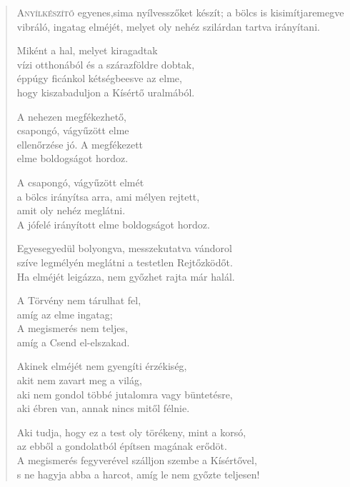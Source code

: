 
\vspace*{-\baselineskip}
\begin{verse}

{\par%
\lettrine[slope=0.5em]{A}{nyílkészítő} {\LettrineTextFont egyenes,}\newline sima nyílvesszőket készít;\newline
a bölcs is kisimítja\verselinebreak remegve vibráló, ingatag elméjét,\verselinebreak
melyet oly nehéz szilárdan tartva irányítani.
\par}

 Miként a hal, melyet kiragadtak\\
vízi otthonából és a szárazföldre dobtak,\\
éppúgy ficánkol kétségbeesve az elme,\\
hogy kiszabaduljon a Kísértő uralmából.

 A nehezen megfékezhető,\\
csapongó, vágyűzött elme\\
ellenőrzése jó. A megfékezett\\
elme boldogságot hordoz.

 A csapongó, vágyűzött elmét\\
a bölcs irányítsa arra, ami mélyen rejtett,\\
amit oly nehéz meglátni.\\
A jófelé irányított elme boldogságot hordoz.

 Egyesegyedül bolyongva, messzekutatva vándorol\\
szíve legmélyén meglátni a testetlen Rejtőzködőt.\\
Ha elméjét leigázza, nem győzhet rajta már halál.

 A Törvény nem tárulhat fel,\\
amíg az elme ingatag;\\
A megismerés nem teljes,\\
amíg a Csend el-elszakad.

 Akinek elméjét nem gyengíti érzékiség,\\
akit nem zavart meg a világ,\\
aki nem gondol többé jutalomra vagy büntetésre,\\
aki ébren van, annak nincs mitől félnie.

 Aki tudja, hogy ez a test oly törékeny, mint a korsó,\\
az ebből a gondolatból építsen magának erődöt.\\
A megismerés fegyverével szálljon szembe a Kísértővel,\\
s ne hagyja abba a harcot, amíg le nem győzte teljesen!


\end{verse}
